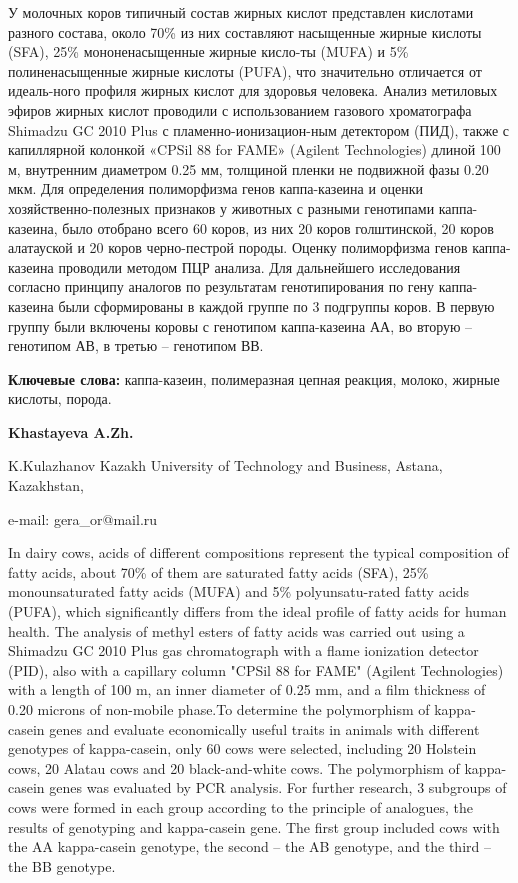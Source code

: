 У молочных коров типичный состав жирных кислот представлен кислотами
разного состава, около 70\% из них составляют насыщенные жирные кислоты
(SFA), 25\% мононенасыщенные жирные кисло-ты (MUFA) и 5\%
полиненасыщенные жирные кислоты (PUFA), что значительно отличается от
идеаль-ного профиля жирных кислот для здоровья человека. Анализ метиловых
эфиров жирных кислот проводили с использованием газового хроматографа
Shimadzu GC 2010 Plus с пламенно-ионизацион-ным детектором (ПИД), также с
капиллярной колонкой «CPSil 88 for FAME» (Agilent Technologies) длиной
100 м, внутренним диаметром 0.25 мм, толщиной пленки не подвижной фазы
0.20 мкм. Для определения полиморфизма генов каппа-казеина и оценки
хозяйственно-полезных признаков у животных с разными генотипами
каппа-казеина, было отобрано всего 60 коров, из них 20 коров
голштинской, 20 коров алатауской и 20 коров черно-пестрой породы. Оценку
полиморфизма генов каппа-казеина проводили методом ПЦР анализа. Для
дальнейшего исследования согласно принципу аналогов по результатам
генотипирования по гену каппа-казеина были сформированы в каждой группе
по 3 подгруппы коров. В первую группу были включены коровы с генотипом
каппа-казеина АА, во вторую -- генотипом АВ, в третью -- генотипом ВВ.

{\bfseries Ключевые слова:} каппа-казеин, полимеразная цепная реакция,
молоко, жирные кислоты, порода.

\begin{center}

{\bfseries Khastayeva A.Zh.}

K.Kulazhanov Kazakh University of Technology and Business, Astana,
Kazakhstan,

e-mail: gera\_or@mail.ru
\end{center}

In dairy cows, acids of different compositions represent the typical
composition of fatty acids, about 70\% of them are saturated fatty acids
(SFA), 25\% monounsaturated fatty acids (MUFA) and 5\% polyunsatu-rated
fatty acids (PUFA), which significantly differs from the ideal profile
of fatty acids for human health. The analysis of methyl esters of fatty
acids was carried out using a Shimadzu GC 2010 Plus gas chromatograph
with a flame ionization detector (PID), also with a capillary column
"CPSil 88 for FAME" (Agilent Technologies) with a length of 100 m, an
inner diameter of 0.25 mm, and a film thickness of 0.20 microns of
non-mobile phase.To determine the polymorphism of kappa-casein genes and
evaluate economically useful traits in animals with different genotypes
of kappa-casein, only 60 cows were selected, including 20 Holstein cows,
20 Alatau cows and 20 black-and-white cows. The polymorphism of
kappa-casein genes was evaluated by PCR analysis. For further research,
3 subgroups of cows were formed in each group according to the principle
of analogues, the results of genotyping and kappa-casein gene. The first
group included cows with the AA kappa-casein genotype, the second -- the
AB genotype, and the third -- the BB genotype.

